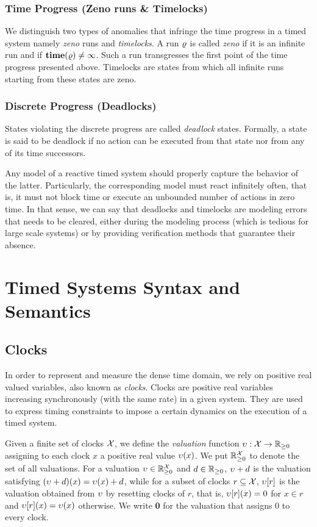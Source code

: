 \subsubsection{Time Progress (Zeno runs \& Timelocks)} 
We distinguish two types of anomalies that infringe the time progress in
a timed system namely \emph{zeno} runs and \emph{timelocks}.
A run $\varrho$ is called \emph{zeno} if it is 
an infinite run and if $\mathbf{time(\varrho)}\neq\infty$. Such a run transgresses the 
first point of the time progress presented above.
Timelocks are states from which all infinite runs starting from these states
are zeno.
\subsubsection{Discrete Progress (Deadlocks)}
States violating the discrete progress are called \emph{deadlock} states.
Formally, a state is said to be deadlock if no action can be executed from 
that state nor from any of its time successors. 

Any model of a reactive timed system should properly capture the behavior 
of the latter. Particularly, the corresponding model must react infinitely often,
that is, it must not block time or execute an unbounded number of actions in zero 
time. In that sense, we can say that deadlocks and timelocks are modeling errors
that needs to be cleared, either during the modeling process (which is tedious 
for large scale systems) or by providing verification methods that guarantee
their absence. 


\section{Timed Systems Syntax and Semantics}\label{sec:2.2}
\subsection*{Clocks}
In order to represent and measure the dense time domain, we rely on positive 
real valued variables, also known as \emph{clocks}. Clocks are 
positive real variables increasing synchronously (with the same rate) in a 
given system. They are used to express timing constraints to impose 
a certain dynamics on the execution of a timed system.

Given a finite set of clocks $\mathcal{X}$, we define the \emph{valuation} function
$\upsilon:\mathcal{X}\to\mathbb{R}_{\ge 0}$ assigning to each clock $x$ a positive real value 
$\upsilon(x)$. We put $\mathbb{R}_{\ge 0}^{\mathcal{X}}$ to denote the set of all valuations.
For a valuation $\upsilon\in\mathbb{R}_{\ge 0}^{\mathcal{X}}$ and $d\in\mathbb{R}_{\ge 0}$, $\upsilon+d$ is the valuation
satisfying $(\upsilon+d)(x)=\upsilon(x)+d$, while for a subset of clocks 
$r\subseteq\mathcal{X}$, $\upsilon[r]$ is the valuation obtained from $\upsilon$ by 
resetting clocks of $r$, that is, $\upsilon[r](x)=0$ for $x\in r$ and
$\upsilon[r](x)=\upsilon(x)$ otherwise. We write {\bf 0} for the valuation 
that assigns 0 to every clock.

